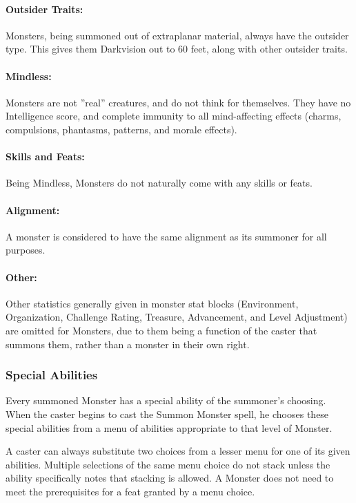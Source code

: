 \paragraph{Outsider Traits:} Monsters, being summoned out of extraplanar material, always have the outsider type. 
This gives them Darkvision out to 60 feet, along with other outsider traits.

\paragraph{Mindless:} Monsters are not ''real'' creatures, and do not think for themselves.
They have no Intelligence score, and complete immunity to all mind-affecting effects (charms, compulsions, phantasms, patterns, and morale effects).

\paragraph{Skills and Feats:} Being Mindless, Monsters do not naturally come with any skills or feats.

\paragraph{Alignment:} A monster is considered to have the same alignment as its summoner for all purposes.

\paragraph{Other:} Other statistics generally given in monster stat blocks (Environment, Organization, Challenge Rating, Treasure, Advancement, and Level Adjustment)
are omitted for Monsters, due to them being a function of the caster that summons them, rather than a monster in their own right.
\subsubsection{Special Abilities} 
Every summoned Monster has a special ability of the summoner's choosing. 
When the caster begins to cast the Summon Monster spell, 
he chooses these special abilities from a menu of abilities appropriate to that level of Monster.

A caster can always substitute two choices from a lesser menu for one of its given abilities. 
Multiple selections of the same menu choice do not stack unless the ability specifically notes that stacking is allowed.
A Monster does not need to meet the prerequisites for a feat granted by a menu choice. 

